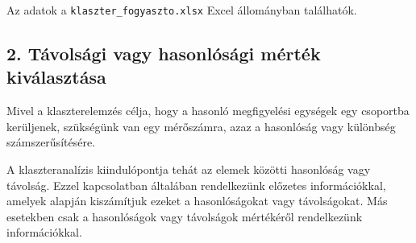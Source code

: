 \documentclass[
  letterpaper,
]{krantz}
\makeatletter
\newenvironment{Shaded}{\begin{snugshade}}{\end{snugshade}}
\newcommand{\AttributeTok}[1]{\textcolor[rgb]{0.40,0.45,0.13}{#1}}
\newcommand{\CommentTok}[1]{\textcolor[rgb]{0.37,0.37,0.37}{#1}}
\newcommand{\FunctionTok}[1]{\textcolor[rgb]{0.28,0.35,0.67}{#1}}
\newcommand{\NormalTok}[1]{\textcolor[rgb]{0.00,0.23,0.31}{#1}}
\newcommand{\OtherTok}[1]{\textcolor[rgb]{0.00,0.23,0.31}{#1}}
\newcommand{\SpecialCharTok}[1]{\textcolor[rgb]{0.37,0.37,0.37}{#1}}
\newcommand{\StringTok}[1]{\textcolor[rgb]{0.13,0.47,0.30}{#1}}
\newenvironment{kframe}{%
\medskip{}
\setlength{\fboxsep}{.8em}
 \def\at@end@of@kframe{}%
 \ifinner\ifhmode%
  \def\at@end@of@kframe{\end{minipage}}%
  \begin{minipage}{\columnwidth}%
 \fi\fi%
 \def\FrameCommand##1{\hskip\@totalleftmargin \hskip-\fboxsep
 \colorbox{shadecolor}{##1}\hskip-\fboxsep
     \hskip-\linewidth \hskip-\@totalleftmargin \hskip\columnwidth}%
 \MakeFramed {\advance\hsize-\width
   \@totalleftmargin\z@ \linewidth\hsize
   \@setminipage}}%
 {\par\unskip\endMakeFramed%
 \at@end@of@kframe}
\renewenvironment{Shaded}{\begin{kframe}}{\end{kframe}}
\makeatother
\begin{document}
Az adatok a \texttt{klaszter\_fogyaszto.xlsx} Excel állományban
találhatók.

\begin{Shaded}
\end{Shaded}

\hypertarget{tuxe1volsuxe1gi-vagy-hasonluxf3suxe1gi-muxe9rtuxe9k-kivuxe1lasztuxe1sa}{%
\subsection{2. Távolsági vagy hasonlósági mérték
kiválasztása}\label{tuxe1volsuxe1gi-vagy-hasonluxf3suxe1gi-muxe9rtuxe9k-kivuxe1lasztuxe1sa}}

Mivel a klaszterelemzés célja, hogy a hasonló megfigyelési egységek egy
csoportba kerüljenek, szükségünk van egy mérőszámra, azaz a hasonlóság
vagy különbség számszerűsítésére.

A klaszteranalízis kiindulópontja tehát az elemek közötti hasonlóság
vagy távolság. Ezzel kapcsolatban általában rendelkezünk előzetes
információkkal, amelyek alapján kiszámítjuk ezeket a hasonlóságokat vagy
távolságokat. Más esetekben csak a hasonlóságok vagy távolságok
mértékéről rendelkezünk információkkal.
\end{document}
